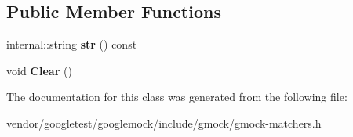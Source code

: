 \subsection*{Public Member Functions}
\begin{DoxyCompactItemize}
\item 
internal\+::string {\bfseries str} () const \hypertarget{classtesting_1_1StringMatchResultListener_a601171722243ac405f40c3efbec6f982}{}\label{classtesting_1_1StringMatchResultListener_a601171722243ac405f40c3efbec6f982}

\item 
void {\bfseries Clear} ()\hypertarget{classtesting_1_1StringMatchResultListener_afd6e59e768516386a3908e7f5cc135d3}{}\label{classtesting_1_1StringMatchResultListener_afd6e59e768516386a3908e7f5cc135d3}

\end{DoxyCompactItemize}


The documentation for this class was generated from the following file\+:\begin{DoxyCompactItemize}
\item 
vendor/googletest/googlemock/include/gmock/gmock-\/matchers.\+h\end{DoxyCompactItemize}

